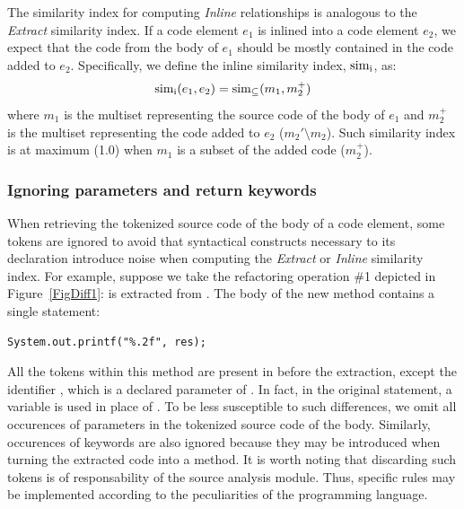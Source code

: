The similarity index for computing \textit{Inline} relationships is analogous to the \textit{Extract} similarity index.
If a code element $e_1$ is inlined into a code element $e_2$, we expect that the code from the body of $e_1$ should be mostly contained in the code added to $e_2$. Specifically, we define the inline similarity index, $\operatorname{sim_{i}}$, as:
\begin{align}
\operatorname{sim_{i}}(e_1, e_2) = \operatorname{sim_{\subseteq}}(m_1, m_2^+)
\end{align}
where $m_1$ is the multiset representing the source code of the body of $e_1$ and $m_2^+$ is the multiset representing the code added to $e_2$ ($m_2' \setminus m_2$). Such similarity index is at maximum (1.0) when $m_1$ is a subset of the added code ($m_2^+$).





\subsubsection{Ignoring parameters and return keywords}
\label{SecIgnoringReturn}

When retrieving the tokenized source code of the body of a code element, some tokens are ignored to avoid that syntactical constructs necessary to its declaration
introduce noise when computing the \textit{Extract} or \textit{Inline} similarity index.
For example, suppose we take the refactoring operation \#1 depicted in Figure~\ref{FigDiff1}:  is extracted from .
The body of the new method  contains a single statement:
\begin{lstlisting}
System.out.printf("%.2f", res);
\end{lstlisting}
All the tokens within this method are present in  before the extraction, except the identifier , which is a declared parameter of . In fact, in the original statement, a variable  is used in place of . To be less susceptible to such differences, we omit all occurences of parameters in the tokenized source code of the body. Similarly, occurences of  keywords are also ignored because they may be introduced when turning the extracted code into a method.
It is worth noting that discarding such tokens is of responsability of the source analysis module. Thus, specific rules may be implemented according to the peculiarities of the programming language.

